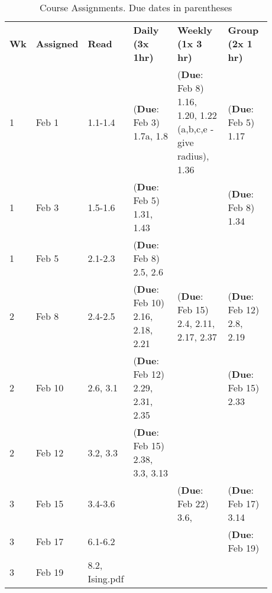 \documentclass[12pt]{article}
\begin{document}
{ 
\setlength{\arrayrulewidth}{.4mm}
\setlength{\tabcolsep}{8pt}
{
  \begin{table}[]
    \footnotesize
\caption{\footnotesize{Course Assignments. Due dates in parentheses}}
\label{tab:course-assignments}
\begin{tabular}{p{0.03\linewidth}|p{0.08\linewidth}|p{0.065\linewidth}|p{0.25\linewidth}|p{0.25\linewidth}|p{0.2\linewidth}}
\textbf{Wk} & \textbf{Assigned} & \textbf{Read}           & \textbf{Daily (3x 1hr)}            & \textbf{Weekly (1x 3 hr)}                                       & \textbf{Group (2x 1 hr)}    \\
1  & Feb 1    & 1.1-1.4        & (\textbf{Due}: Feb 3) 1.7a, 1.8    & (\textbf{Due}: Feb 8) 1.16, 1.20, 1.22 (a,b,c,e - give radius), 1.36 & (\textbf{Due}: Feb 5) 1.17       \\
1  & Feb 3    & 1.5-1.6        & (\textbf{Due}: Feb 5) 1.31, 1.43        &                                                        & (\textbf{Due}: Feb 8) 1.34       \\
1  & Feb 5    & 2.1-2.3        & (\textbf{Due}: Feb 8) 2.5, 2.6          &                                                        &                    \\
2  & Feb 8    & 2.4-2.5        & (\textbf{Due}: Feb 10) 2.16, 2.18, 2.21 & (\textbf{Due}: Feb 15) 2.4, 2.11, 2.17, 2.37                         & (\textbf{Due}: Feb 12) 2.8, 2.19 \\
2  & Feb 10   & 2.6, 3.1       & (\textbf{Due}: Feb 12) 2.29, 2.31, 2.35 &                                                        & (\textbf{Due}: Feb 15) 2.33      \\
2  & Feb 12   & 3.2, 3.3       & (\textbf{Due}: Feb 15) 2.38, 3.3, 3.13  &                                                        &                    \\
3  & Feb 15   & 3.4-3.6        &                           & (\textbf{Due}: Feb 22) 3.6,                                          & (\textbf{Due}: Feb 17) 3.14      \\
3  & Feb 17   & 6.1-6.2        &                           &                                                        & (\textbf{Due}: Feb 19)           \\
3  & Feb 19   & 8.2, Ising.pdf &                           &                                                        &                    \\

\end{tabular}
\end{table}}}
\end{document}

